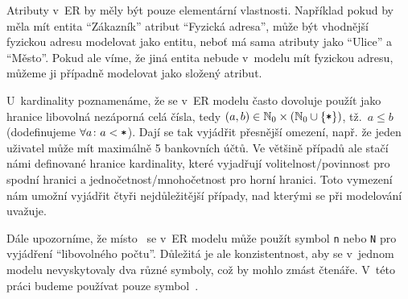 Atributy v~ER by měly být pouze elementární vlastnosti.
Například pokud by měla mít entita \enquote{Zákazník} atribut \enquote{Fyzická adresa}, může být vhodnější fyzickou adresu modelovat jako entitu, neboť má sama atributy jako \enquote{Ulice} a \enquote{Město}.
Pokud ale víme, že jiná entita nebude v~modelu mít fyzickou adresu, můžeme ji případně modelovat jako složený atribut.

U~kardinality poznamenáme, že se v~ER modelu často dovoluje použít jako hranice libovolná nezáporná celá čísla, tedy $(a, b)\in \mathbb N_0\times \left(\mathbb N_0 \cup \left\{\texttt{*}\right\}\right)$, tž.~$a\leq b$ (dodefinujeme $\forall a\colon a < \texttt{*}$).
Dají se tak vyjádřit přesnější omezení, např. že jeden uživatel může mít maximálně 5 bankovních účtů.
Ve většině případů ale stačí námi definované hranice kardinality, které vyjadřují volitelnost/povinnost pro spodní hranici a jednočetnost/mnohočetnost pro horní hranici.
Toto vymezení nám umožní vyjádřit čtyři nejdůležitější případy, nad kterými se při modelování uvažuje.

Dále upozorníme, že místo~\many{} se v~ER modelu může použít symbol \texttt{n} nebo \texttt{N} pro vyjádření \enquote{libovolného počtu}.
Důležitá je ale konzistentnost, aby se v~jednom modelu nevyskytovaly dva různé symboly, což by mohlo zmást čtenáře.
V~této práci budeme používat pouze symbol~\many{}.


